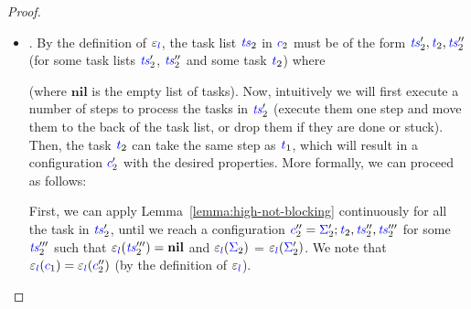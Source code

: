\documentclass{llncs}
\newcommand{\Varid}[1]{\mathit{#1}}
\begin{document}
\begin{proof}
\begin{itemize}
    This ensures that , as well as
     (in zero steps), as claimed.
\item .
    By the definition of \ensuremath{\varepsilon_{\ifc{l}}}, the task list \ensuremath{\ifc{\Varid{ts}}_{2}}
    in \ensuremath{\ifc{c}_{2}} must be of the
    form \ensuremath{\ifc{\Varid{ts}}_{2}',\ifc{\Varid{t}}_{2},\ifc{\Varid{ts}}_{2}''} (for some task lists \ensuremath{\ifc{\Varid{ts}}_{2}'}, \ensuremath{\ifc{\Varid{ts}}_{2}''} and
    some task \ensuremath{\ifc{\Varid{t}}_{2}})
    where
    
    (where \ensuremath{\mathbf{nil}} is the empty list of tasks).
    Now, intuitively we will first execute a number of steps to process
    the tasks in \ensuremath{\ifc{\Varid{ts}}_{2}'} (execute them one step and move them to the back
    of the task list, or drop them if they are done or stuck).  Then, the task
    \ensuremath{\ifc{\Varid{t}}_{2}} can take the same step as \ensuremath{\ifc{\Varid{t}}_{1}}, which will result in a configuration
    \ensuremath{\ifc{c}_{2}'}
    with the desired properties.
    More formally, we can proceed as follows:
    
    First, we can apply Lemma~\ref{lemma:high-not-blocking} continuously
    for all the task in \ensuremath{\ifc{\Varid{ts}}_{2}'},
    until we reach a configuration \ensuremath{\ifc{c}_{2}''\mathrel{=}\ifc{\Sigma}_{2}';\ifc{\Varid{t}}_{2},\ifc{\Varid{ts}}_{2}'',\ifc{\Varid{ts}}_{2}'''}
    for some \ensuremath{\ifc{\Varid{ts}}_{2}'''} such
    that \ensuremath{\varepsilon_{\ifc{l}}(\ifc{\Varid{ts}}_{2}''')\mathrel{=}\mathbf{nil}} and \ensuremath{\varepsilon_{\ifc{l}}(\ifc{\Sigma}_{2})} = \ensuremath{\varepsilon_{\ifc{l}}(\ifc{\Sigma}_{2}')}.
    We note that \ensuremath{\varepsilon_{\ifc{l}}(\ifc{c}_{1})\mathrel{=}\varepsilon_{\ifc{l}}(\ifc{c}_{2}'')} (by the definition of
    \ensuremath{\varepsilon_{\ifc{l}}}).
    

\end{itemize}
\end{proof}
\end{document}
